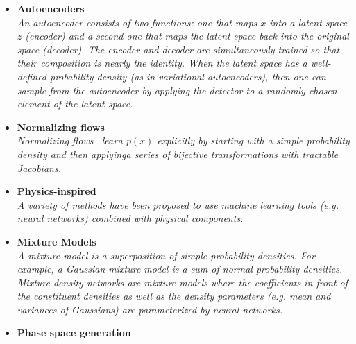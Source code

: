 \documentclass[12pt,letterpaper]{article}
\begin{document}
\begin{itemize}
\begin{itemize}
		\item \textbf{Autoencoders}~\cite{Monk:2018zsb,ATL-SOFT-PUB-2018-001,Cheng:2020dal,1816035,Howard:2021pos,Buhmann:2021lxj,Bortolato:2021zic,deja2020endtoend,Hariri:2021clz,Fanelli:2019qaq,Collins:2021pld,Orzari:2021suh,Jawahar:2021vyu}
		\\\textit{An autoencoder consists of two functions: one that maps $x$ into a latent space $z$ (encoder) and a second one that maps the latent space back into the original space (decoder).  The encoder and decoder are simultaneously trained so that their composition is nearly the identity.  When the latent space has a well-defined probability density (as in variational autoencoders), then one can sample from the autoencoder by applying the detector to a randomly chosen element of the latent space.}
\item \textbf{Normalizing flows}~\cite{Albergo:2019eim,Kanwar:2003.06413,Brehmer:2020vwc,Bothmann:2020ywa,Gao:2020zvv,Gao:2020vdv,Nachman:2020lpy,Choi:2020bnf,Lu:2020npg,Bieringer:2020tnw,Hollingsworth:2021sii,Winterhalder:2021ave,Krause:2021ilc,Hackett:2021idh,Menary:2021tjg,Hallin:2021wme,NEURIPS2020_a878dbeb,Vandegar:2020yvw,Jawahar:2021vyu,Bister:2021arb,Krause:2021wez}
		\\\textit{Normalizing flows~\cite{pmlr-v37-rezende15} learn $p(x)$ explicitly by starting with a simple probability density and then applyinga series of bijective transformations with tractable Jacobians.}
		\item \textbf{Physics-inspired}~\cite{Andreassen:2018apy,Andreassen:2019txo,1808876,Lai:2020byl,Barenboim:2021vzh}
		\\\textit{A variety of methods have been proposed to use machine learning tools (e.g. neural networks) combined with physical components.}
		\item \textbf{Mixture Models}~\cite{Chen:2020uds,Burton:2021tsd,Graziani:2021vai}
		\\\textit{A mixture model is a superposition of simple probability densities.  For example, a Gaussian mixture model is a sum of normal probability densities.  Mixture density networks are mixture models where the coefficients in front of the constituent densities as well as the density parameters (e.g. mean and variances of Gaussians) are parameterized by neural networks.}
		\item \textbf{Phase space generation}~\cite{Bendavid:2017zhk,Bothmann:2020ywa,Gao:2020zvv,Gao:2020vdv,Klimek:2018mza,Carrazza:2020rdn,Nachman:2020fff,Chen:2020nfb,Verheyen:2020bjw,Backes:2020vka,Danziger:2021eeg,Yoon:2020zmb}

\end{itemize}
\end{itemize}
\end{document}
